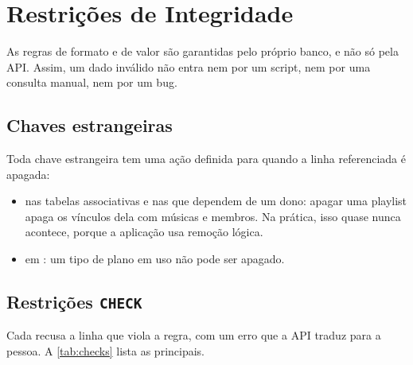 \section{Restrições de Integridade}
\label{sec:integridade}

As regras de formato e de valor são garantidas pelo próprio banco, e não só
pela API. Assim, um dado inválido não entra nem por um script, nem por uma
consulta manual, nem por um bug.

\subsection{Chaves estrangeiras}

Toda chave estrangeira tem uma ação definida para quando a linha referenciada
é apagada:

\begin{itemize}
  \item {} nas tabelas associativas e nas que dependem
    de um dono: apagar uma playlist apaga os vínculos dela com músicas e
    membros. Na prática, isso quase nunca acontece, porque a aplicação usa
    remoção lógica.
  \item {} em : um tipo de plano
    em uso não pode ser apagado.
\end{itemize}

\subsection{Restrições \texttt{CHECK}}

Cada  recusa a linha que viola a regra, com um erro que a API
traduz para a pessoa. A \cref{tab:checks} lista as principais.

